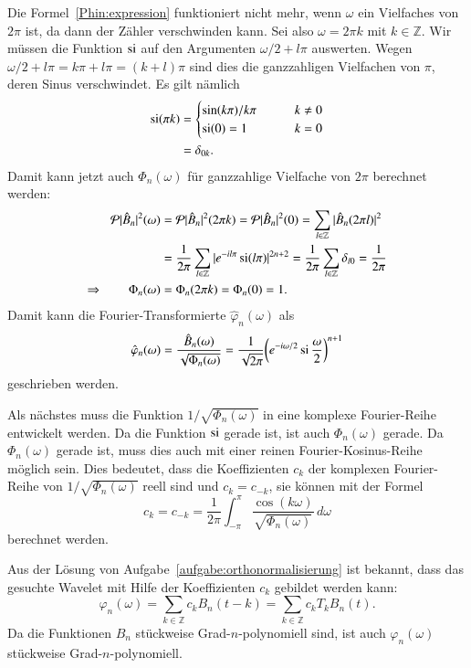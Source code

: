Die Formel~\eqref{Phin:expression} funktioniert nicht mehr, wenn $\omega$
ein Vielfaches von $2\pi$ ist, da dann der Zähler verschwinden kann.
Sei also $\omega = 2\pi k$ mit $k\in\mathbb Z$.
Wir müssen die Funktion $\si$ auf den Argumenten
$\omega/2+l\pi$ auswerten.
Wegen $\omega/2 + l\pi=k\pi + l\pi = (k+l)\pi$ sind dies die ganzzahligen
Vielfachen von $\pi$, deren Sinus verschwindet.
Es gilt nämlich
\begin{align*}
\si (\pi k)
&=
\begin{cases}
\sin(k\pi)/k\pi&\qquad k\ne 0\\
\si(0)=1&\qquad k=0
\end{cases}
\\
&=
\delta_{0k}.
\end{align*}
Damit kann jetzt auch $\Phi_n(\omega)$ für ganzzahlige Vielfache von $2\pi$ 
berechnet werden:
\begin{align*}
\mathcal{P}|\hat{B}_n|^2(\omega)
&=
\mathcal{P}|\hat{B}_n|^2(2\pi k)
=
\mathcal{P}|\hat{B}_n|^2(0)
=
\sum_{l\in\mathbb Z} |\hat{B}_n(2\pi l)|^2
\\
&=
\frac1{2\pi}
\sum_{l\in\mathbb Z} |e^{-il\pi}\si(l\pi)|^{2n+2}
=
\frac1{2\pi}
\sum_{l\in\mathbb Z} \delta_{l0}
=
\frac1{2\pi}
\\
\Rightarrow\qquad
\Phi_n(\omega)
&=
\Phi_n(2\pi k)
=
\Phi_n(0)=1.
\end{align*}
Damit kann die Fourier-Transformierte $\hat{\varphi}_n(\omega)$ als
\[
\hat{\varphi}_n(\omega)
=
\frac{\hat{B}_n(\omega)}{\sqrt{\Phi_n(\omega)}}
=
\frac{1}{\sqrt{2\pi}}
\biggl(e^{-i\omega/2}\si\frac{\omega}2\biggr)^{n+1}
\]
geschrieben werden.

Als nächstes muss die Funktion $1/\sqrt{\Phi_n(\omega)}$ in eine komplexe
Fourier-Reihe entwickelt werden.
Da die Funktion $\si$ gerade ist, ist auch $\Phi_n(\omega)$ gerade.
Da $\Phi_n(\omega)$ gerade ist, muss dies auch mit einer reinen
Fourier-Kosinus-Reihe möglich sein.
Dies bedeutet, dass die Koeffizienten $c_k$ der komplexen Fourier-Reihe
von $1/\sqrt{\Phi_n(\omega)}$ reell sind und $c_k=c_{-k}$,
sie können mit 
der Formel
\begin{equation}
c_k = c_{-k}
=
\frac{1}{2\pi}
\int_{-\pi}^{\pi}
\frac{\cos(k\omega)}{\sqrt{\Phi_n(\omega)}}
\,d\omega
\label{sqrtPhincoef}
\end{equation}
berechnet werden.

Aus der Lösung von Aufgabe~\ref{aufgabe:orthonormalisierung} ist bekannt,
dass das gesuchte Wavelet mit Hilfe der Koeffizienten $c_k$ gebildet werden 
kann:
\[
\varphi_n(\omega)
=
\sum_{k\in\mathbb Z}
c_k B_n(t-k)
=
\sum_{k\in\mathbb Z}
c_k T_kB_n(t).
\]
Da die Funktionen $B_n$ stückweise Grad-$n$-polynomiell sind, ist auch
$\varphi_n(\omega)$ stückweise Grad-$n$-po\-ly\-no\-miell.

